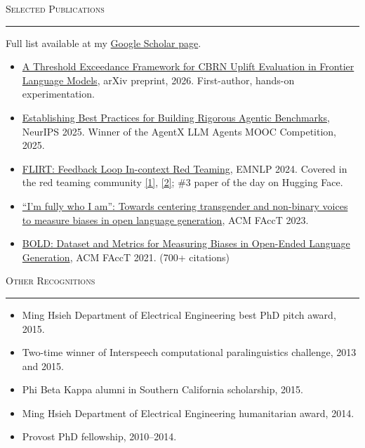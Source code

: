 \documentclass[11pt]{article}
\newcommand{\sectionheading}[1]{%
  \vspace{8pt}%
  {\large\scshape #1}\par\vspace{1pt}\hrule\vspace{3pt}%
}
\begin{document}
\sectionheading{Selected Publications}
Full list available at my \href{https://scholar.google.com/citations?user=gSTLsFcAAAAJ}{Google Scholar page}.

\begin{itemize}
  \item \href{https://arxiv.org/abs/2607.12200}{A Threshold Exceedance Framework for CBRN Uplift Evaluation in Frontier Language Models}, arXiv preprint, 2026. {\color{gray}First-author, hands-on experimentation.}
  \item \href{https://arxiv.org/abs/2507.02825}{Establishing Best Practices for Building Rigorous Agentic Benchmarks}, NeurIPS 2025. {\color{gray}Winner of the AgentX LLM Agents MOOC Competition, 2025.}
  \item \href{https://arxiv.org/abs/2308.04265}{FLIRT: Feedback Loop In-context Red Teaming}, EMNLP 2024. {\color{gray}Covered in the red teaming community \href{https://lilianweng.github.io/posts/2023-10-25-adv-attack-llm/}{[1]}, \href{https://huggingface.co/papers/2308.04265}{[2]}; \#3 paper of the day on Hugging Face.}
  \item \href{https://arxiv.org/abs/2305.09941}{``I'm fully who I am'': Towards centering transgender and non-binary voices to measure biases in open language generation}, ACM FAccT 2023.
  \item \href{https://arxiv.org/abs/2101.11718}{BOLD: Dataset and Metrics for Measuring Biases in Open-Ended Language Generation}, ACM FAccT 2021. {\color{gray}(700+ citations)}
\end{itemize}

\sectionheading{Other Recognitions}
\begin{itemize}
  \item Ming Hsieh Department of Electrical Engineering best PhD pitch award, 2015.
  \item Two-time winner of Interspeech computational paralinguistics challenge, 2013 and 2015.
  \item Phi Beta Kappa alumni in Southern California scholarship, 2015.
  \item Ming Hsieh Department of Electrical Engineering humanitarian award, 2014.
  \item Provost PhD fellowship, 2010--2014.
\end{itemize}
\end{document}
